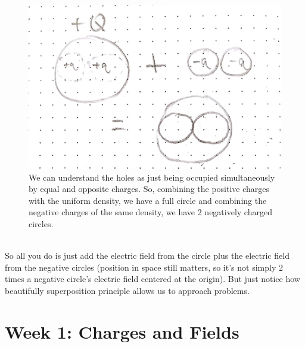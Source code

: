 \documentclass{article}
\begin{document}
\pagebreak
\begin{figure}[ht]
\center
\includegraphics[width=.4\textwidth]{Superposition2.jpg}
\caption{We can understand the holes as just being occupied simultaneously by equal and opposite charges. So, combining the positive charges with the uniform density, we have a full circle and combining the negative charges of the same density, we have 2 negatively charged circles.}
\end{figure}\\
So all you do is just add the electric field from the circle plus the electric field from the negative circles (position in space still matters, so it's not simply 2 times a negative circle's electric field centered at the origin). But just notice how beautifully superposition principle allows us to approach problems. 

\pagebreak
\section{Week 1: Charges and Fields}
\end{document}
